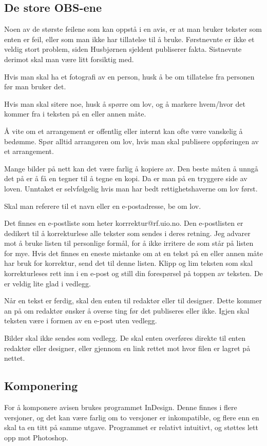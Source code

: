 \subsection{De store OBS-ene}
 Noen av de største feilene som kan oppstå i en avis, er at man bruker
tekster som enten er feil, eller som man ikke har tillatelse til å
bruke. Førstnevnte er ikke et veldig stort problem, siden Husbjørnen
sjeldent publiserer fakta. Sistnevnte derimot skal man være litt
forsiktig med.

 Hvis man skal ha et fotografi av en person, husk å be om tillatelse
fra personen før man bruker det.

 Hvis man skal sitere noe, husk å spørre om lov, og å markere
hvem/hvor det kommer fra i teksten på en eller annen måte.

 Å vite om et arrangement er offentlig eller internt kan ofte være
vanskelig å bedømme. Spør alltid arrangøren om lov, hvis man skal
publisere oppføringen av et arrangement.

 Mange bilder på nett kan det være farlig å kopiere av. Den beste
måten å unngå det på er å få en tegner til å tegne en kopi. Da er man
på en tryggere side av loven. Unntaket er selvfølgelig hvis man har
bedt rettighetshaverne om lov først.

 Skal man referere til et navn eller en e-postadresse, be om lov.

 Det finnes en e-postliste som heter korrrektur@rf.uio.no. Den
e-postlisten er dedikert til å korrekturlese alle tekster som sendes i
deres retning. Jeg advarer mot å bruke listen til personlige formål,
for å ikke irritere de som står på listen for mye. Hvis det finnes en
eneste mistanke om at en tekst på en eller annen måte har bruk for
korrektur, send det til denne listen. Klipp og lim teksten som skal
korrekturleses rett inn i en e-post og still din forespørsel på toppen
av teksten. De er veldig lite glad i vedlegg.

 Når en tekst er ferdig, skal den enten til redaktør eller til
designer. Dette kommer an på om redaktør ønsker å overse ting før det
publiseres eller ikke. Igjen skal teksten være i formen av en e-post
uten vedlegg.

 Bilder skal ikke sendes som vedlegg. De skal enten overføres direkte
til enten redaktør eller designer, eller gjennom en link rettet mot
hvor filen er lagret på nettet.

\subsection{Komponering}
 For å komponere avisen brukes programmet InDesign. Denne finnes i
flere versjoner, og det kan være farlig om to versjoner er
inkompatible, og flere enn en skal ta en titt på samme utgave.
Programmet er relativt intuitivt, og støttes lett opp mot Photoshop.

